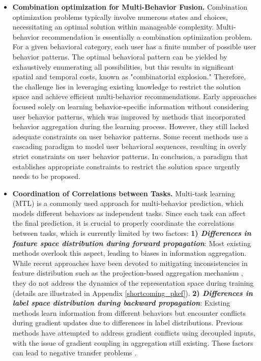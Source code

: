\begin{itemize}
\item \textbf{Combination optimization for Multi-Behavior Fusion.} Combination optimization problems typically involve numerous states and choices, necessitating an optimal solution within manageable complexity. Multi-behavior recommendation is essentially a combination optimization problem. For a given behavioral category, each user has a finite number of possible user behavior patterns. The optimal behavioral pattern can be yielded by exhaustively enumerating all possibilities, but this results in significant spatial and temporal costs, known as "combinatorial explosion." Therefore, the challenge lies in leveraging existing knowledge to restrict the solution space and achieve efficient multi-behavior recommendations. Early approaches \cite{lightgcn, smbrec} focused solely on learning behavior-specific information without considering user behavior patterns, which was improved by methods \cite{mbgcn, cigf, bipn} that incorporated behavior aggregation during the learning process. However, they still lacked adequate constraints on user behavior patterns. Some recent methods \cite{crgcn, mbcgcn, pkef} use a cascading paradigm to model user behavioral sequences, resulting in overly strict constraints on user behavior patterns. In conclusion, a paradigm that establishes appropriate constraints to restrict the solution space urgently needs to be proposed.

\item \textbf{Coordination of Correlations between Tasks.} Multi-task learning (MTL) is a commonly used approach for multi-behavior prediction, which models different behaviors as independent tasks. Since each task can affect the final prediction, it is crucial to properly coordinate the correlations between tasks, which is currently limited by two factors: \textbf{1) \textit{Differences in feature space distribution during forward propagation}}: Most existing methods overlook this aspect, leading to biases in information aggregation. While recent approaches have been devoted to mitigating inconsistencies in feature distribution such as the projection-based aggregation mechanism \cite{pkef}, they do not address the dynamics of the representation space during training (details are illustrated in Appendix \ref{shortcoming_pkef}). \textbf{2) \textit{Differences in label space distribution during backward propagation}}: Existing methods learn information from different behaviors but encounter conflicts during gradient updates due to differences in label distributions. Previous methods \cite{cigf, pkef} have attempted to address gradient conflicts using decoupled inputs, with the issue of gradient coupling in aggregation still existing. These factors can lead to negative transfer problems \cite{negativeTransfer}. 
\end{itemize}

